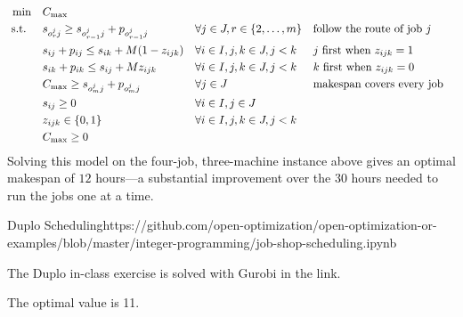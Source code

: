\begin{align*}
\min \quad & C_{\max} \\
\mbox{ s.t. } \quad  & s_{o^{j}_{r}j} \geq s_{o^{j}_{r-1}j} +p_{o^{j}_{r-1}j} && \forall j \in {J}, r \in \{2,\dots,m\} && \mbox{follow the route of job $j$} \\
& s_{ij} + p_{ij} \leq s_{ik} + M (1-z_{ijk}) && \forall i \in {I}, j,k \in {J}, j < k && \mbox{$j$ first when $z_{ijk} = 1$} \\
& s_{ik} + p_{ik} \leq s_{ij} + M z_{ijk} && \forall i \in {I}, j,k \in {J}, j < k && \mbox{$k$ first when $z_{ijk} = 0$}\\
& C_{\max} \geq s_{o^{j}_{m}j} + p_{o^{j}_{m}j} && \forall j \in {J} && \mbox{makespan covers every job}\\
& s_{ij} \geq 0 && \forall i \in {I}, j \in {J} \\
& z_{ijk} \in \{0,1\} && \forall i \in {I}, j,k \in {J}, j < k \\
& C_{\max} \geq 0
\end{align*}
Solving this model on the four-job, three-machine instance above gives an optimal makespan of $12$ hours---a substantial improvement over the $30$ hours needed to run the jobs one at a time.
\begin{examplewithallcode}{Duplo Scheduling}{}{}{https://github.com/open-optimization/open-optimization-or-examples/blob/master/integer-programming/job-shop-scheduling.ipynb}

The Duplo in-class exercise is solved with Gurobi in the link.

The optimal value is 11.

\begin{center}
\par{}\label{fig:jssp-duplo}%


\par{}\label{fig:jssp-duplo-actual}%

\end{center}
\end{examplewithallcode}

